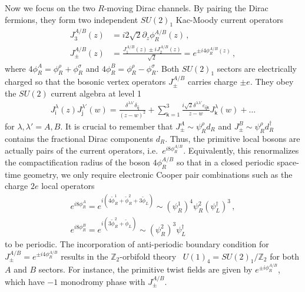 Now we focus on the two $R$-moving Dirac channels. By pairing the Dirac fermions, they form two independent $SU(2)_1$ Kac-Moody current operators~\cite{bigyellowbook} \begin{align}J_3^{A/B}(z)&=i2\sqrt{2}\partial_z\phi^{A/B}_R(z)\label{SU2current} \,, \\J_\pm^{A/B}(z)&=\frac{J_1^{A/B}(z)\pm iJ_2^{A/B}(z)}{\sqrt{2}}=e^{\pm i4\phi^{A/B}_R(z)}\nonumber \,, \end{align} where $4\phi^A_R=\phi^\rho_R+\phi^\sigma_R$ and $4\phi^B_R=\phi^\rho_R-\phi^\sigma_R$. Both $SU(2)_1$ sectors are electrically charged so that the bosonic vertex operators $J_\pm^{A/B}$ carries charge $\pm e$. They obey the $SU(2)$ current algebra at level 1 \begin{align}J^\lambda_{\mathsf{i}}(z)J^{\lambda'}_{\mathsf{j}}(w)=\frac{\delta^{\lambda\lambda'}\delta_{\mathsf{ij}}}{(z-w)^2}+\sum_{\mathsf{k}=1}^3\frac{i\sqrt{2}\delta^{\lambda\lambda'}\varepsilon_{\mathsf{ijk}}}{z-w}J^\lambda_{\mathsf{k}}(w)+\ldots\label{SU2algebra}\end{align} for $\lambda,\lambda'=A,B$. It is crucial to remember that $J_\pm^A\sim\psi^\rho_Rd_R$ and $J_\pm^B\sim\psi^\rho_Rd_R^\dagger$ contains the fractional Dirac components $d_R$. Thus, the primitive local bosons are actually pairs of the current operators, i.e.~$e^{i8\phi^{A/B}_R}$. Equivalently, this renormalizes the compactification radius of the boson $4\phi^{A/B}_R$ so that in a closed periodic space-time geometry, we only require electronic Cooper pair combinations such as the charge $2e$ local operators \begin{gather}e^{i8\phi^A_R}=e^{i(4\tilde\phi^1_R+\tilde\phi^2_R+3\tilde\phi_L)}\sim(\psi^1_R)^4\psi^2_R(\psi_L^\dagger)^3\nonumber \,, \\e^{i8\phi^B_R}=e^{i(3\tilde\phi^2_R+\tilde\phi_L)}\sim(\psi^2_R)^3\psi_L^\dagger\end{gather} to be periodic. The incorporation of anti-periodic boundary condition for $J_\pm^{A/B}=e^{\pm i4\phi^{A/B}_R}$ results in the $\mathbb{Z}_2$-orbifold theory~\cite{Ginsparg88,DijkgraafVafaVerlindeVerlinde99} $U(1)_4=SU(2)_1/\mathbb{Z}_2$ for both $A$ and $B$ sectors. For instance, the primitive twist fields are given by $e^{\pm i\phi^{A/B}_R}$, which have $-1$ monodromy phase with $J_\pm^{A/B}$. 

